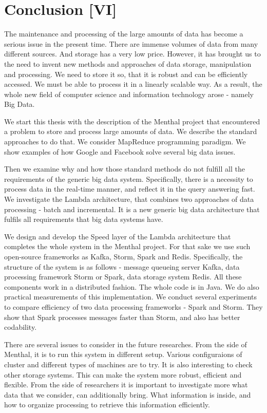 \chapter{Conclusion [VI]}
\label{chap:conclusion}

The maintenance and processing of the large amounts of data has become a serious issue in the present time.
There are immense volumes of data from many different sources.
And storage has a very low price.
However, it has brought us to the need to invent new methods and approaches of data storage, manipulation and processing.
We need to store it so, that it is robust and can be efficiently accessed.
We must be able to process it in a linearly scalable way.
As a result, the whole new field of computer science and information technology arose - namely Big Data.

We start this thesis with the description of the Menthal project that encountered a problem to store and process large amounts of data.
We describe the standard approaches to do that.
We consider MapReduce programming paradigm.
We show examples of how Google and Facebook solve several big data issues.

Then we examine why and how those standard methods do not fulfill all the requirements of the generic big data system.
Specifically, there is a necessity to process data in the real-time manner, and reflect it in the query answering fast.
We investigate the Lambda architecture, that combines two approaches of data processing - batch and incremental.
It is a new generic big data architecture that fulfils all requirements that big data systems have.

We design and develop the Speed layer of the Lambda architecture that completes the whole system in the Menthal project.
For that sake we use such open-source frameworks as Kafka, Storm, Spark and Redis.
Specifically, the structure of the system is as follows - message queueing server Kafka, data processing framework Storm or Spark, data storage system Redis.
All these components work in a distributed fashion.
The whole code is in Java.
We do also practical measurements of this implementation.
We conduct several experiments to compare efficiency of two data processing frameworks - Spark and Storm.
They show that Spark processes messages faster than Storm, and also has better codability.

There are several issues to consider in the future researches.
From the side of Menthal, it is to run this system in different setup.
Various configuraions of cluster and different types of machines are to try.
It is also interesting to check other storage systems.
This can make the system more robust, efficient and flexible.
From the side of researchers it is important to investigate more what data that we consider, can additionally bring.
What information is inside, and how to organize processing to retrieve this information efficiently.